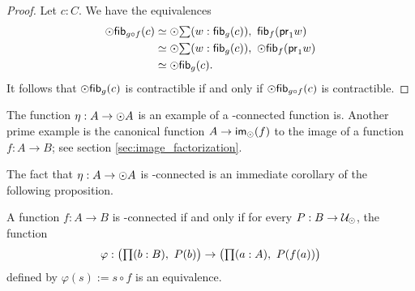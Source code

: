\begin{proof}
Let $c:C$. We have the equivalences
\begin{align*}
\modal\hfib{g\circ f}c& \simeq \modal \sm{w:\hfib{g}c}\hfib{f}{\proj1 w}\\
& \simeq \modal\sm{w:\hfib{g}c}\modal\hfib{f}{\proj1 w}\\
& \simeq \modal\hfib{g}c.
\end{align*}
It follows that $\odot\mathsf{fib}_{g}(c)$ is contractible if and only if $\odot\mathsf{fib}_{g\circ f}(c)$ is
contractible.
\end{proof}

The function $\eta:A\to\odot A$ is an example of a \modal-connected function is. Another prime example is the
canonical function $A\to\mathsf{im}_{\odot}(f)$ to the image of a function $f:A\to B$; see section \ref{sec:image_factorization}.

The fact that $\eta:A\to\odot A$ is \modal-connected is an immediate corollary of the following proposition.

\begin{lem}\label{prop:nconnected_tested_by_lv_n_dependent types}
A function $f:A\to B$ is \modal-connected if and only if for every $P:B\to\mathcal{U}_{\odot}$, the function
\begin{equation*}
\varphi :\big(\prd{b:B} P(b)\big)\to\big(\prd{a:A}P(f(a))\big)
\end{equation*}
defined by $\varphi(s):=s\circ f$ is an equivalence.
\end{lem}

